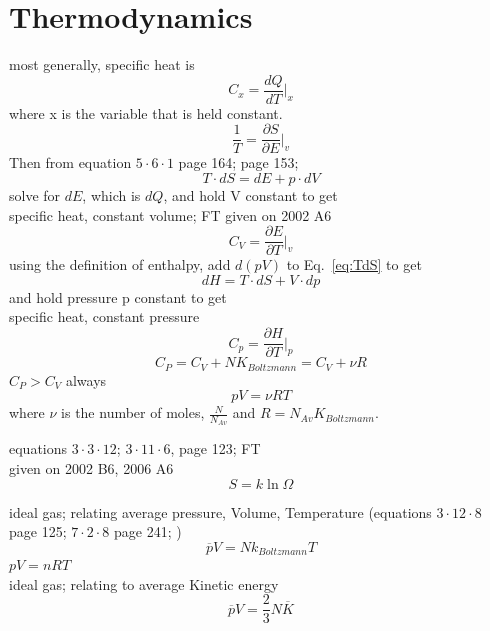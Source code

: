 \documentclass[12pt]{article}  %
\newcommand{\pfrac}[2]{\frac{\partial #1}{\partial #2}}
\def\qualifyingyear{F}
\begin{document}
\section{Thermodynamics}
most generally, specific heat is 
\begin{equation}
C_x = \frac{dQ}{dT}|_x
\end{equation}
where x is the variable that is held constant. 
\begin{equation}
 \frac{1}{T} = \pfrac{S}{E} |_v
\end{equation}
Then from equation  $5 \cdot 6 \cdot 1$ page 164; page 153; \cite{ReifThermo}
\begin{equation}
T \cdot dS = dE + p \cdot dV
\label{eq:TdS}
\end{equation}
solve for $dE$, which is $dQ$, and hold V constant to get \\ 
specific heat, constant volume; 
\if\qualifyingyear T
given on 2002 A6
\fi
\begin{equation}
C_V = \pfrac{E}{T}|_v
\end{equation}
using the definition of enthalpy, add $d(pV)$ to Eq.~\ref{eq:TdS} to get
\begin{equation}
dH = T \cdot dS + V \cdot dp
\end{equation}
and hold pressure p constant to get \\ 
specific heat, constant pressure
\begin{equation}
C_p = \pfrac{H}{T}|_p
\end{equation}
\begin{equation}
 C_P = C_V + N K_{Boltzmann} = C_V + \nu R
\end{equation}
$C_P > C_V$ always
\begin{equation}
 pV = \nu R T
\end{equation}
where $\nu$ is the number of moles, $\frac{N}{N_{Av}}$ and $R=N_{Av} K_{Boltzmann}$.

equations $3 \cdot 3 \cdot 12$; $3 \cdot 11 \cdot 6$, page 123; \cite{ReifThermo}
\if\qualifyingyear T
 \\ 
given on 2002 B6, 2006 A6
\fi
\begin{equation}
S = k \ln \Omega
\end{equation}

ideal gas; relating average pressure, Volume, Temperature (equations  $3 \cdot 12 \cdot 8$ page 125; $7 \cdot 2 \cdot 8$ page 241; \cite{ReifThermo})
\begin{equation}
\overline{p} V = N k_{Boltzmann} T
\end{equation}
$pV = nRT$ \\ 
ideal gas; relating to average Kinetic energy
\begin{equation}
\overline{p} V = \frac{2}{3} N \overline{K}
\end{equation}
\end{document}
